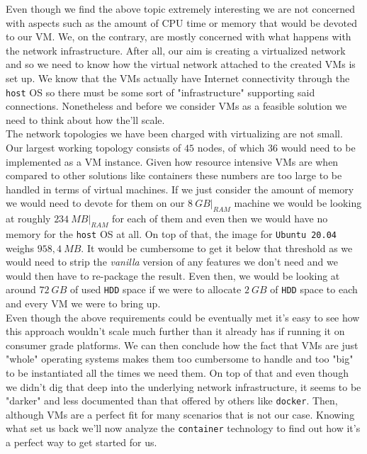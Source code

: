             Even though we find the above topic extremely interesting we are not concerned with aspects such as the amount of CPU time or memory that would be devoted to our VM. We, on the contrary, are mostly concerned with what happens with the network infrastructure. After all, our aim is creating a virtualized network and so we need to know how the virtual network attached to the created VMs is set up. We know that the VMs actually have Internet connectivity through the \texttt{host} OS so there must be some sort of "infrastructure" supporting said connections. Nonetheless and before we consider VMs as a feasible solution we need to think about how the'll scale.\\

            The network topologies we have been charged with virtualizing are not small. Our largest working topology consists of $45$ nodes, of which $36$ would need to be implemented as a VM instance. Given how resource intensive VMs are when compared to other solutions like containers these numbers are too large to be handled in terms of virtual machines. If we just consider the amount of memory we would need to devote for them on our $8\ GB\rvert_{RAM}$ machine we would be looking at roughly $234\ MB\rvert_{RAM}$ for each of them and even then we would have no memory for the \texttt{host} OS at all. On top of that, the image for \texttt{Ubuntu 20.04} weighs $958,4\ MB$. It would be cumbersome to get it below that threshold as we would need to strip the \textit{vanilla} version of any features we don't need and we would then have to re-package the result. Even then, we would be looking at around $72\ GB$ of used \texttt{HDD} space if we were to allocate $2\ GB$ of \texttt{HDD} space to each and every VM we were to bring up.\\

            Even though the above requirements could be eventually met it's easy to see how this approach wouldn't scale much further than it already has if running it on consumer grade platforms. We can then conclude how the fact that VMs are just "whole" operating systems makes them too cumbersome to handle and too "big" to be instantiated all the times we need them. On top of that and even though we didn't dig that deep into the underlying network infrastructure, it seems to be "darker" and less documented than that offered by others like \texttt{docker}. Then, although VMs are a perfect fit for many scenarios that is not our case. Knowing what set us back we'll now analyze the \texttt{container} technology to find out how it's a perfect way to get started for us.

